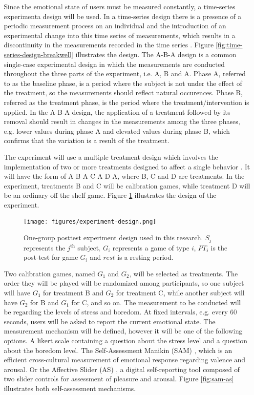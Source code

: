 Since the emotional state of users must be measured constantly, a time-series experimenta design will be used. In a time-series design there is a presence of a periodic measurement process on an individual and the introduction of an experimental change into this time series of measurements, which results in a discontinuity in the measurements recorded in the time series \textcite{campbell2015experimental}. Figure \ref{fig:time-series-design-breakwell} illustrates the design. The A-B-A design is a common single-case experimental design in which the measurements are conducted throughout the three parts of the experiment, i.e. A, B and A. Phase A, referred to as the baseline phase, is a period where the subject is not under the effect of the treatment, so the measurements should reflect natural occurences. Phase B, referred as the treatment phase, is the period where the treatment/intervention is applied. In the A-B-A design, the application of a treatment followed by its removal should result in changes in the measurements among the three phases, e.g. lower values during phase A and elevated values during phase B, which confirms that the variation is a result of the treatment.

The experiment will use a multiple treatment design which involves the implementation of two or more treatments designed to affect a single behavior \parencite{robson2016real}. It will have the form of A-B-A-C-A-D-A, where B, C and D are treatments. In the experiment, treatments B and C will be calibration games, while treatment D will be an ordinary off the shelf game. Figure \ref{fig:closing-experiment2-design} illustrates the design of the experiment.

\begin{figure}[ht]
    \centering
    \texttt{[image: figures/experiment-design.png]}
    \caption{One-group posttest experiment design used in this research. $S_j$ represents the $j^{\text{th}}$ subject, $G_i$ represents a game of type $i$, $PT_i$ is the post-test for game $G_i$ and $rest$ is a resting period.}
    \label{fig:closing-experiment2-design}
\end{figure}

Two calibration games, named $G_1$ and $G_2$, will be selected as treatments. The order they will be played will be randomized among participants, so one subject will have $G_1$ for treatment B and $G_2$ for treatment C, while another subject will have $G_2$ for B and $G_1$ for C, and so on. The measurement to be conducted will be regarding the levels of stress and boredom. At fixed intervals, e.g. every 60 seconds, users will be asked to report the current emotional state. The measurement mechanism will be defined, however it will be one of the following options. A likert scale containing a question about the stress level and a question about the boredom level. The Self-Assessment Manikin (SAM) \parencite{morris1995observations}, which is an efficient cross-cultural measurement of emotional response regarding valence and arousal. Or the Affective Slider (AS) \parencite{betella2016affective}, a digital self-reporting tool composed of two slider controls for assessment of pleasure and arousal. Figure \ref{fig:sam-as} illustrates both self-assessment mechanisms.


